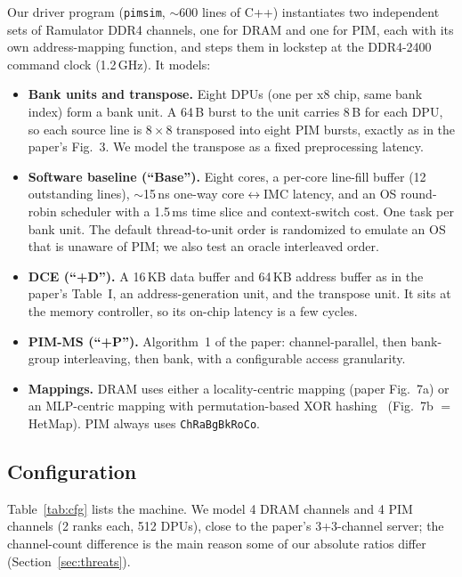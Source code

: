 \documentclass[conference]{IEEEtran}
\begin{document}
Our driver program (\texttt{pimsim}, $\sim$600 lines of C++) instantiates two
independent sets of Ramulator DDR4 channels, one for DRAM and one for PIM, each
with its own address-mapping function, and steps them in lockstep at the
DDR4-2400 command clock (1.2\,GHz). It models:

\begin{itemize}
\item \textbf{Bank units and transpose.} Eight DPUs (one per x8 chip, same bank
index) form a bank unit. A 64\,B burst to the unit carries 8\,B for each DPU, so
each source line is $8\times8$ transposed into eight PIM bursts, exactly as in
the paper's Fig.~3. We model the transpose as a fixed preprocessing latency.
\item \textbf{Software baseline (``Base'').} Eight cores, a per-core line-fill
buffer (12 outstanding lines), $\sim$15\,ns one-way core$\leftrightarrow$IMC
latency, and an OS round-robin scheduler with a 1.5\,ms time slice and
context-switch cost. One task per bank unit. The default thread-to-unit order
is randomized to emulate an OS that is unaware of PIM; we also test an
oracle interleaved order.
\item \textbf{DCE (``+D'').} A 16\,KB data buffer and 64\,KB address buffer as
in the paper's Table~I, an address-generation unit, and the transpose unit. It
sits at the memory controller, so its on-chip latency is a few cycles.
\item \textbf{PIM-MS (``+P'').} Algorithm~1 of the paper: channel-parallel,
then bank-group interleaving, then bank, with a configurable access granularity.
\item \textbf{Mappings.} DRAM uses either a locality-centric mapping (paper
Fig.~7a) or an MLP-centric mapping with permutation-based XOR
hashing~\cite{xorhash} (Fig.~7b $=$ HetMap). PIM always uses
\texttt{ChRaBgBkRoCo}.
\end{itemize}

\subsection{Configuration}
Table~\ref{tab:cfg} lists the machine. We model 4 DRAM channels and 4 PIM
channels (2 ranks each, 512 DPUs), close to the paper's 3+3-channel server; the
channel-count difference is the main reason some of our absolute ratios differ
(Section~\ref{sec:threats}).
\end{document}

